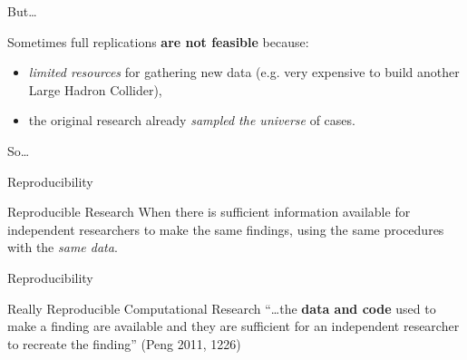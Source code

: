 \documentclass[10pt]{beamer}
\begin{document}
\begin{frame}{But\ldots}

    Sometimes full replications \textbf{are not feasible} because:

    \begin{itemize}
        \item \emph{limited resources} for gathering new data (e.g. very expensive to build another Large Hadron Collider),

        \vspace{0.5cm}

        \item the original research already \emph{sampled the universe} of cases.
    \end{itemize}

    \vspace{0.5cm}

    {\large{So\ldots}}

\end{frame}

\begin{frame}{Reproducibility}

    \begin{exampleblock}{Reproducible Research}
        When there is sufficient information available for independent researchers to make the same findings, using the same procedures with the \emph{same data}.
    \end{exampleblock}

\end{frame}

\begin{frame}{Reproducibility}

    \begin{exampleblock}{Really Reproducible Computational Research}
        ``\ldots the \textbf{data and code} used to make a finding are available and they are sufficient for an independent researcher to recreate the finding'' (Peng 2011, 1226)
    \end{exampleblock}

\end{frame}
\end{document}
